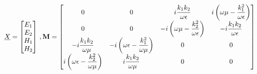     \begin{equation}
        \underline{X} = 
        \begin{bmatrix}
        E_1 \\ 
        E_2 \\ 
        H_1 \\ 
        H_2 \\
        \end{bmatrix}\,,
        \mathbf{M} = \begin{bmatrix}
        0 & 0 & i\dfrac{k_1k_2}{\omega\epsilon} & i\left(\omega\mu - \dfrac{k_1^2}{\omega\epsilon}\right)\\
        0 & 0 & -i\left(\omega\mu - \dfrac{k_2^2}{\omega\epsilon}\right) & -i\dfrac{k_1k_2}{\omega\epsilon}\\
        -i\dfrac{k_1k_2}{\omega\mu} & -i\left(\omega\epsilon - \dfrac{k_1^2}{\omega\mu}\right) & 0 & 0 \\
        i\left(\omega\epsilon - \dfrac{k_2^2}{\omega\mu}\right) & i\dfrac{k_1k_2}{\omega\mu} & 0 & 0 \\
        \end{bmatrix}
    \end{equation}

